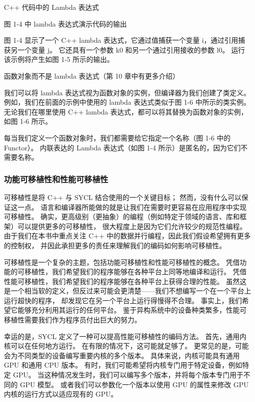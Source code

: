 {\color{red} C++ 代码中的 Lambda 表达式 }

{\color{red} 图 1-4 中 lambda 表达式演示代码的输出 }

图 1-4 显示了一个 C++ lambda 表达式，它通过值捕获一个变量 i，通过引用捕获另一个变量 j。 
它还具有一个参数 k0 和另一个通过引用接收的参数 l0。 运行该示例将产生如图 1-5 所示的输出。

{\color{red} 函数对象而不是 lambda 表达式（第 10 章中有更多介绍）}

我们可以将 lambda 表达式视为函数对象的实例，但编译器为我们创建了类定义。 
例如，我们在前面的示例中使用的 lambda 表达式类似于图 1-6 中所示的类实例。 
无论我们在哪里使用 C++ lambda 表达式，都可以将其替换为函数对象的实例，如图 1-6 所示。

每当我们定义一个函数对象时，我们都需要给它指定一个名称（图 1-6 中的 Functor）。 
内联表达的 Lambda 表达式（如图 1-4 所示）是匿名的，因为它们不需要名称。

\subsubsection{功能可移植性和性能可移植性}
可移植性是将 C++ 与 SYCL 结合使用的一个关键目标； 然而，没有什么可以保证这一点。 
语言和编译器所能做的就是让我们在需要时更容易在应用程序中实现可移植性。 
确实，更高级别（更抽象）的编程（例如特定于领域的语言、库和框架）可以提供更多的可移植性，
很大程度上是因为它们允许较少的规范性编程。 
由于我们在本书中重点关注 C++ 中的数据并行编程，因此我们假设希望拥有更多的控制权，
并因此承担更多的责任来理解我们的编码如何影响可移植性。

可移植性是一个复杂的主题，包括功能可移植性和性能可移植性的概念。 
凭借功能的可移植性，我们希望我们的程序能够在各种平台上同等地编译和运行。 
凭借性能可移植性，我们希望我们的程序能够在各种平台上获得合理的性能。 
虽然这是一个相当软的定义，但反过来可能会更清楚——我们不想编写一个在一个平台上运行超快的程序，
却发现它在另一个平台上运行得慢得不合理。 事实上，我们希望它能够充分利用其运行的任何平台。 
鉴于异构系统中的设备种类繁多，性能可移植性需要我们作为程序员付出巨大的努力。

幸运的是，SYCL 定义了一种可以提高性能可移植性的编码方法。 首先，通用内核可以在任何地方运行。 
在有限的情况下，这可能就足够了。 更常见的是，可能会为不同类型的设备编写重要内核的多个版本。 
具体来说，内核可能具有通用 GPU 和通用 CPU 版本。 有时，我们可能希望将内核专门用于特定设备，例如特定 GPU。 
当这种情况发生时，我们可以编写多个版本，并将每个版本专门用于不同的 GPU 模型。 
或者我们可以参数化一个版本以使用 GPU 的属性来修改 GPU 内核的运行方式以适应现有的 GPU。

